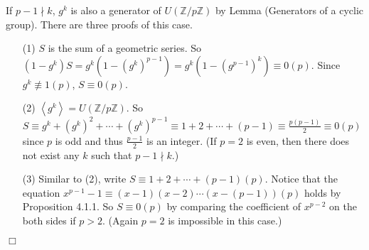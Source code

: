 \documentclass{article}
\begin{document}
If $p - 1 \nmid k$, $g^k$ is also a generator of $U(\mathbb{Z}/p\mathbb{Z})$
by Lemma (Generators of a cyclic group).
There are three proofs of this case.
\begin{enumerate}
\item[(1)]
$S$ is the sum of a geometric series.
So $(1 - g^k) S = g^k (1 - (g^k)^{p - 1}) = g^k (1 - (g^{p - 1})^k) \equiv 0 (p)$.
Since $g^k \not\equiv 1 (p)$, $S \equiv 0 (p)$.
\item[(2)]
$\left \langle g^k \right \rangle = U(\mathbb{Z}/p\mathbb{Z})$. So
$S \equiv g^k + (g^k)^2 + \cdots + (g^k)^{p - 1} \equiv 1 + 2 + \cdots + (p - 1)
\equiv \frac{p(p - 1)}{2} \equiv 0 (p)$ since $p$ is odd and thus $\frac{p - 1}{2}$ is an integer.
(If $p = 2$ is even, then there does not exist any $k$ such that $p - 1 \nmid k$.)
\item[(3)]
Similar to (2), write $S \equiv 1 + 2 + \cdots + (p - 1) (p)$. Notice that the equation
$x^{p - 1} - 1 \equiv (x - 1)(x - 2) \cdots (x - (p - 1)) (p)$ holds by Proposition 4.1.1.
So $S \equiv 0 (p)$ by comparing the coefficient of $x^{p - 2}$ on the both sides if $p > 2$.
(Again $p = 2$ is impossible in this case.)
\end{enumerate}

$\Box$ \\
\end{document}
